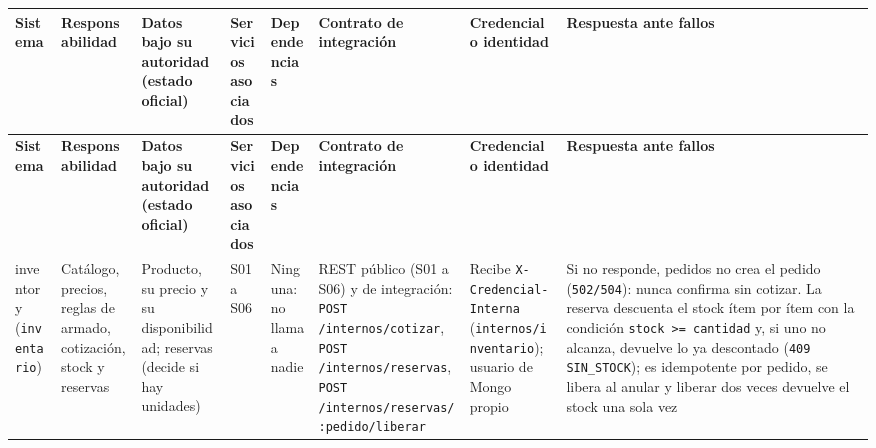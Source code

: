 \begin{landscape}
\vspace{0.6em}
{\scriptsize
\setlength{\LTpre}{0pt}\setlength{\LTpost}{0pt}
\setlength{\tabcolsep}{3pt}\renewcommand{\arraystretch}{1.15}
\begin{longtable}{|>{\raggedright\arraybackslash}p{}|>{\raggedright\arraybackslash}p{}|>{\raggedright\arraybackslash}p{}|>{\raggedright\arraybackslash}p{}|>{\raggedright\arraybackslash}p{}|>{\raggedright\arraybackslash}p{}|>{\raggedright\arraybackslash}p{}|>{\raggedright\arraybackslash}p{}|}
\hline
\textbf{Sistema} & \textbf{Responsabilidad} & \textbf{Datos bajo su autoridad (estado oficial)} & \textbf{Servicios asociados} & \textbf{Dependencias} & \textbf{Contrato de integración} & \textbf{Credencial o identidad} & \textbf{Respuesta ante fallos} \\ \hline
\endfirsthead
\hline
\textbf{Sistema} & \textbf{Responsabilidad} & \textbf{Datos bajo su autoridad (estado oficial)} & \textbf{Servicios asociados} & \textbf{Dependencias} & \textbf{Contrato de integración} & \textbf{Credencial o identidad} & \textbf{Respuesta ante fallos} \\ \hline
\endhead
inventory (\texttt{inventario}) & Catálogo, precios, reglas de armado, cotización, stock y reservas & Producto, su precio y su disponibilidad; reservas (decide si hay unidades) & S01 a S06 & Ninguna: no llama a nadie & REST público (S01 a S06) y de integración: \texttt{POST /\allowbreak{}internos/\allowbreak{}cotizar}, \texttt{POST /\allowbreak{}internos/\allowbreak{}reservas}, \texttt{POST /\allowbreak{}internos/\allowbreak{}reservas/\allowbreak{}:\allowbreak{}pedido/\allowbreak{}liberar} & Recibe \texttt{X-\allowbreak{}Credencial-\allowbreak{}Interna} (\texttt{internos/\allowbreak{}inventario}); usuario de Mongo propio & Si no responde, pedidos no crea el pedido (\texttt{502/\allowbreak{}504}): nunca confirma sin cotizar. La reserva descuenta el stock ítem por ítem con la condición \texttt{stock >=\allowbreak{} cantidad} y, si uno no alcanza, devuelve lo ya descontado (\texttt{409 SIN\_\allowbreak{}STOCK}); es idempotente por pedido, se libera al anular y liberar dos veces devuelve el stock una sola vez \\ \hline

\end{longtable}}
\end{landscape}
